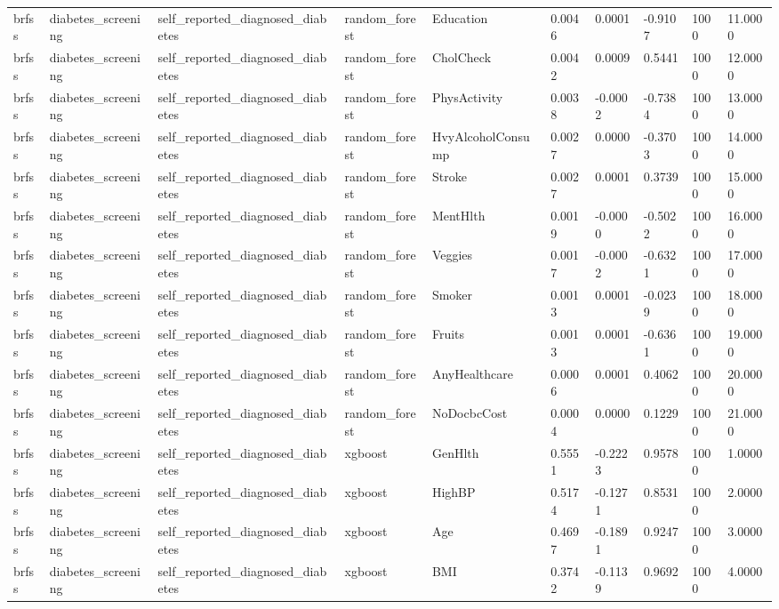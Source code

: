 \begin{tabular}{llllllllll}
brfss & diabetes\_screening & self\_reported\_diagnosed\_diabetes & random\_forest & Education & 0.0046 & 0.0001 & -0.9107 & 1000 & 11.0000 \\
brfss & diabetes\_screening & self\_reported\_diagnosed\_diabetes & random\_forest & CholCheck & 0.0042 & 0.0009 & 0.5441 & 1000 & 12.0000 \\
brfss & diabetes\_screening & self\_reported\_diagnosed\_diabetes & random\_forest & PhysActivity & 0.0038 & -0.0002 & -0.7384 & 1000 & 13.0000 \\
brfss & diabetes\_screening & self\_reported\_diagnosed\_diabetes & random\_forest & HvyAlcoholConsump & 0.0027 & 0.0000 & -0.3703 & 1000 & 14.0000 \\
brfss & diabetes\_screening & self\_reported\_diagnosed\_diabetes & random\_forest & Stroke & 0.0027 & 0.0001 & 0.3739 & 1000 & 15.0000 \\
brfss & diabetes\_screening & self\_reported\_diagnosed\_diabetes & random\_forest & MentHlth & 0.0019 & -0.0000 & -0.5022 & 1000 & 16.0000 \\
brfss & diabetes\_screening & self\_reported\_diagnosed\_diabetes & random\_forest & Veggies & 0.0017 & -0.0002 & -0.6321 & 1000 & 17.0000 \\
brfss & diabetes\_screening & self\_reported\_diagnosed\_diabetes & random\_forest & Smoker & 0.0013 & 0.0001 & -0.0239 & 1000 & 18.0000 \\
brfss & diabetes\_screening & self\_reported\_diagnosed\_diabetes & random\_forest & Fruits & 0.0013 & 0.0001 & -0.6361 & 1000 & 19.0000 \\
brfss & diabetes\_screening & self\_reported\_diagnosed\_diabetes & random\_forest & AnyHealthcare & 0.0006 & 0.0001 & 0.4062 & 1000 & 20.0000 \\
brfss & diabetes\_screening & self\_reported\_diagnosed\_diabetes & random\_forest & NoDocbcCost & 0.0004 & 0.0000 & 0.1229 & 1000 & 21.0000 \\
brfss & diabetes\_screening & self\_reported\_diagnosed\_diabetes & xgboost & GenHlth & 0.5551 & -0.2223 & 0.9578 & 1000 & 1.0000 \\
brfss & diabetes\_screening & self\_reported\_diagnosed\_diabetes & xgboost & HighBP & 0.5174 & -0.1271 & 0.8531 & 1000 & 2.0000 \\
brfss & diabetes\_screening & self\_reported\_diagnosed\_diabetes & xgboost & Age & 0.4697 & -0.1891 & 0.9247 & 1000 & 3.0000 \\
brfss & diabetes\_screening & self\_reported\_diagnosed\_diabetes & xgboost & BMI & 0.3742 & -0.1139 & 0.9692 & 1000 & 4.0000 \\

\end{tabular}
